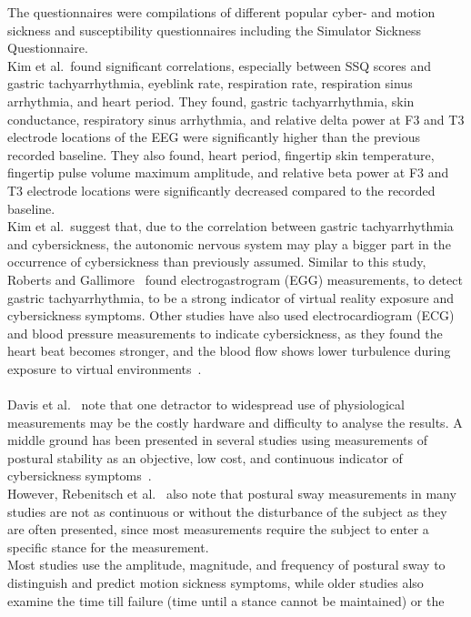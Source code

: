 The questionnaires were compilations of different popular cyber- and motion sickness and susceptibility questionnaires
including the Simulator Sickness Questionnaire.
\\
Kim et al.\ found significant correlations, especially between SSQ scores and gastric tachyarrhythmia, eyeblink rate,
respiration rate, respiration sinus arrhythmia, and heart period.
They found, gastric tachyarrhythmia, skin conductance, respiratory sinus arrhythmia, and relative delta power at F3
and T3 electrode locations of the EEG were significantly higher than the previous recorded baseline.
They also found, heart period, fingertip skin temperature, fingertip pulse volume maximum amplitude, and relative
beta power at F3 and T3 electrode locations were significantly decreased compared to the recorded baseline.
\\
Kim et al.\ suggest that, due to the correlation between gastric tachyarrhythmia and cybersickness, the autonomic
nervous system may play a bigger part in the occurrence of cybersickness than previously assumed.
Similar to this study, Roberts and Gallimore~\cite{Roberts2005} found electrogastrogram (EGG) measurements, to detect
gastric tachyarrhythmia, to be a strong indicator of virtual reality exposure and cybersickness symptoms.
Other studies have also used electrocardiogram (ECG) and blood pressure measurements to indicate cybersickness, as 
they found the heart beat becomes stronger, and the blood flow shows lower turbulence during exposure to virtual
environments~\cite{Kiryu2007, Watanabe2008}.
\\
\\
Davis et al.~\cite{Davis2014} note that one detractor to widespread use of physiological measurements may be the
costly hardware and difficulty to analyse the results.
A middle ground has been presented in several studies using measurements of postural stability as an objective, low
cost, and continuous indicator of cybersickness symptoms~\cite{Rebenitsch2016}.
\\
However, Rebenitsch et al.~\cite{Rebenitsch2016} also note that postural sway measurements in many studies are not as
continuous or without the disturbance of the subject as they are often presented, since most measurements require the
subject to enter a specific stance for the measurement.
\\
Most studies use the amplitude, magnitude, and frequency of postural sway to distinguish and predict motion sickness
symptoms, while older studies also examine the time till failure (time until a stance cannot be maintained) or the
